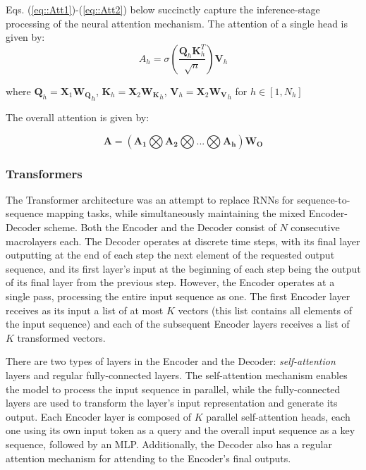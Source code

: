 \documentclass[preprint,review,12pt]{elsarticle}
\begin{document}
Eqs. (\ref{eq::Att1})-(\ref{eq::Att2}) below succinctly capture the inference-stage processing of the neural attention mechanism. The attention of a single head is given by:
\begin{equation}
    A_h = \sigma (\frac{\mathbf{Q}_h \mathbf{K}_h^{T}}{\sqrt{n}}) \mathbf{V}_h
\label{eq::Att1}
\end{equation}

\noindent where $\mathbf{Q}_h = \mathbf{X}_1\mathbf{W_Q}_h$, $\mathbf{K}_h = \mathbf{X}_2\mathbf{W_K}_h$, $\mathbf{V}_h = \mathbf{X}_2\mathbf{W_V}_h$ for $h \in [1, N_h]$

The overall attention is given by:

\begin{equation}
    \mathbf{A} = (\mathbf{A_1} \bigotimes \mathbf{A_2} \bigotimes ... \bigotimes \mathbf{A_h}) \mathbf{W_O}
\label{eq::Att2}
\end{equation}

\subsubsection{Transformers}
The Transformer architecture \cite{ilia} was an attempt to replace RNNs for sequence-to-sequence mapping tasks, while simultaneously maintaining the mixed Encoder-Decoder scheme. Both the Encoder and the Decoder consist of $N$ consecutive macrolayers each. The Decoder operates at discrete time steps, with its final layer outputting at the end of each step the next element of the requested output sequence, and its first layer's input at the beginning of each step being the output of its final layer from the previous step. However, the Encoder operates at a single pass, processing the entire input sequence as one. The first Encoder layer receives as its input a list of at most $K$ vectors (this list contains all elements of the input sequence) and each of the subsequent Encoder layers receives a list of $K$  transformed vectors.

There are two types of layers in the Encoder and the Decoder: \textit{self-attention} layers and regular fully-connected layers. The self-attention mechanism enables the model to process the input sequence in parallel, while the fully-connected layers are used to transform the layer's input representation and generate its output. Each Encoder layer is composed of $K$ parallel self-attention heads, each one using its own input token as a query and the overall input sequence as a key sequence, followed by an MLP. Additionally, the Decoder also has a regular attention mechanism for attending to the Encoder's final outputs.
\end{document}
